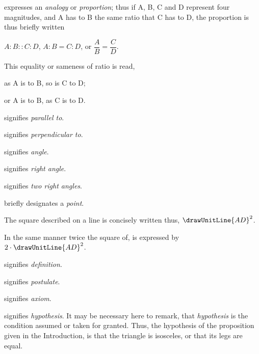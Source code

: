 \documentclass{byrne-book}
\begin{document}
\symb{$:\ ::\ :$}
 expresses an \emph{analogy} or \emph{proportion}; thus if A, B, C and D represent four magnitudes, and A has to B the same ratio that C has to D, the proportion is thus briefly written

$A : B :: C : D$, $A : B = C : D$, or $\dfrac{A}{B} = \dfrac{C}{D}$.

This equality or sameness of ratio is read,

as A is to B, so is C to D;

or A is to B, as C is to D.

\symb{$\parallel$}
 signifies \emph{parallel to}.

\symb{$\perp$}
 signifies \emph{perpendicular to}.


 signifies \emph{angle}.

 signifies \emph{right angle}.

\symb{\drawTwoRightAngles}
 signifies \emph{two right angles}.



briefly designates a \emph{point}.

The square described on a line is concisely written thus, $\drawUnitLine{AD}^2$.

In the same manner twice the square of, is expressed by $2 \cdot \drawUnitLine{AD}^2$.

\symb{\indefstr}
 signifies \emph{definition}.

\symb{\inpoststr}
 signifies \emph{postulate}.

\symb{\inaxstr}
 signifies \emph{axiom}.

 signifies \emph{hypothesis}. It may be necessary here to remark, that \emph{hypothesis} is the condition assumed or taken for granted. Thus, the hypothesis of the proposition given in the Introduction, is that the triangle is isosceles, or that its legs are equal.
\end{document}
